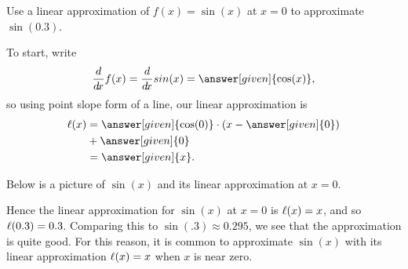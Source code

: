 \documentclass[handout,nooutcomes]{ximera}
\begin{document}

\begin{example}
Use a linear approximation of $f(x) =\sin(x)$ at $x=0$ to approximate
$\sin(0.3)$.
\begin{explanation}
To start, write
\[
\ddx f(x) = \ddx sin(x) = \answer[given]{\cos(x)},
\]
so using point slope form of a line, our linear approximation is
\begin{align*}
\l(x) &= \answer[given]{\cos(0)}\cdot(x-\answer[given]{0}) \\
&+ \answer[given]{0}\\
&= \answer[given]{x}.
\end{align*}

Below is a picture of $\sin(x)$ and its linear approximation at $x=0$.

\begin{image}
\end{image}
Hence the linear approximation for $\sin(x)$ at $x=0$ is $\ell(x) = x$,
and so $\ell(0.3) = 0.3$.  Comparing this to $\sin(.3) \approx 0.295$,
we see that the approximation is quite good. For this reason, it is common
to approximate $\sin(x)$ with its linear approximation $\ell(x) = x$
when $x$ is near zero.  
\end{explanation}
\end{example}
\end{document}
